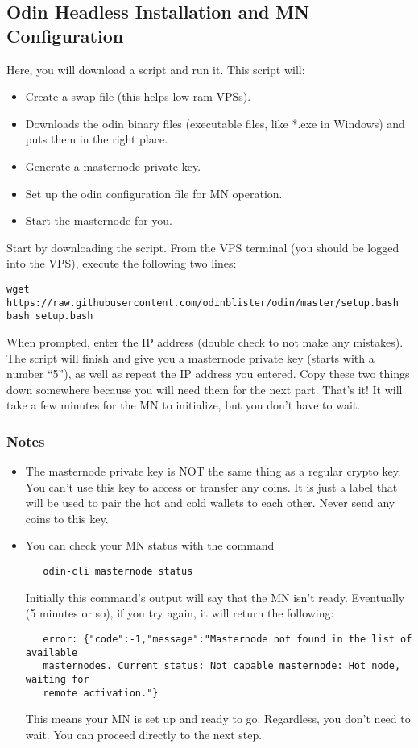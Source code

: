 \documentclass[rmp,12pt,notitlepage]{revtex4-1}
\begin{document}
\subsection{Odin Headless Installation and MN Configuration}
Here, you will download a script and run it.  This script will:
\begin{itemize}[noitemsep]
   \item Create a swap file (this helps low ram VPSs).
   \item Downloads the odin binary files (executable files, like *.exe in Windows) and puts them in the right place.
   \item Generate a masternode private key.
   \item Set up the odin configuration file for MN operation.
   \item Start the masternode for you.
\end{itemize}
Start by downloading the script.  From the VPS terminal (you should be logged into the VPS), execute the following two lines:
\begin{verbatim}
wget https://raw.githubusercontent.com/odinblister/odin/master/setup.bash
bash setup.bash
\end{verbatim}
When prompted, enter the IP address (double check to not make any mistakes).  The script will finish and give you a masternode private key (starts with a number ``5''), as well as repeat the IP address you entered.  Copy these two things down somewhere because you will need them for the next part.  That's it!  It will take a few minutes for the MN to initialize, but you don't have to wait. 

\subsubsection*{Notes}
\begin{itemize}
\item The masternode private key is NOT the same thing as a regular crypto key.  You can't use this key to access or transfer any coins.  It is just a label that will be used to pair the hot and cold wallets to each other.  Never send any coins to this key.   
\item You can check your MN status with the command 
\begin{verbatim}
   odin-cli masternode status
\end{verbatim}
Initially this command's output will say that the MN isn't ready.  Eventually (5 minutes or so), if you try again, it will return the following:
\begin{verbatim}
   error: {"code":-1,"message":"Masternode not found in the list of available 
   masternodes. Current status: Not capable masternode: Hot node, waiting for 
   remote activation."}
\end{verbatim}
This means your MN is set up and ready to go.  Regardless, you don't need to wait. You can proceed directly to the next step.
\end{itemize}
\end{document}
